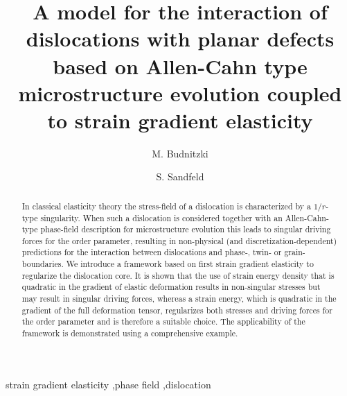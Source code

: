 \documentclass[preprint,review,3p,times,authoryear]{elsarticle}
\begin{document}
\begin{frontmatter}


\author[fzj,tubaf]{M. Budnitzki}
\author[fzj,tubaf]{S. Sandfeld}
\address[fzj]{Institute for Advanced Simulation (IAS-9: Materials Data Science and Informatics), Forschungszentrum Jülich GmbH, 52428 Jülich, Germany}
\address[tubaf]{TU Bergakademie Freiberg, Institute of Mechanics and Fluid Dynamics, Lampadiusstr.~4, 09599 Freiberg}

\title{A model for the interaction of dislocations with planar defects based on Allen-Cahn type microstructure evolution coupled to strain gradient elasticity}


\begin{abstract}
In classical elasticity theory the stress-field of a dislocation is characterized by a $1/r$-type singularity. When such a dislocation is considered together with an Allen-Cahn-type phase-field description for microstructure evolution this leads to singular driving forces for the order parameter, resulting in non-physical (and discretization-dependent) predictions for the interaction between dislocations and phase-, twin- or grain-boundaries. We introduce a framework based on first strain gradient elasticity to regularize the dislocation core. It is shown that the use of strain energy density that is quadratic in the gradient of elastic deformation results in non-singular stresses but may result in singular driving forces, whereas a strain energy, which is quadratic in the gradient of the full deformation tensor, regularizes both stresses and driving forces for the order parameter and is therefore a suitable choice. The applicability of the framework is demonstrated using a comprehensive example.

\end{abstract}


\begin{keyword}
  strain gradient elasticity \sep phase field \sep dislocation


\end{keyword}

\end{frontmatter}
\end{document}
